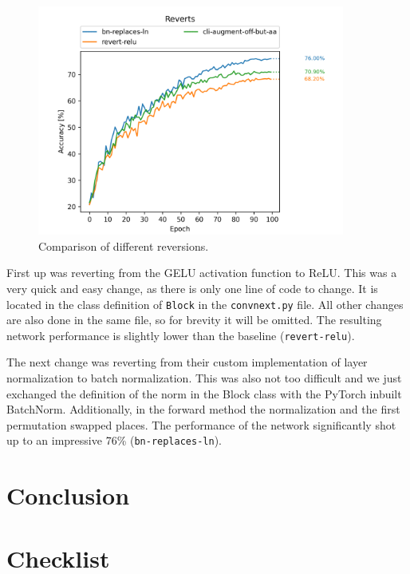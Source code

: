 \documentclass{article}
\begin{document}
    \begin{figure}[h]
        \centering
        \includegraphics[width=0.9\textwidth]{images/reverts}
        \caption{Comparison of different reversions.}
        \label{fig:reverts}
    \end{figure}

    First up was reverting from the GELU activation function to ReLU\@.
    This was a very quick and easy change, as there is only one line of code to change.
    It is located in the class definition of \texttt{Block} in the \texttt{convnext.py} file.
    All other changes are also done in the same file, so for brevity it will be omitted.
    The resulting network performance is slightly lower than the baseline (\texttt{revert-relu}).

    The next change was reverting from their custom implementation of layer normalization to batch normalization.
    This was also not too difficult and we just exchanged the definition of the norm in the Block class with the PyTorch inbuilt BatchNorm.
    Additionally, in the forward method the normalization and the first permutation swapped places.
    The performance of the network significantly shot up to an impressive 76\% (\texttt{bn-replaces-ln}).



    \section{Conclusion}\label{sec:conclusion}

    \printbibliography
    \section*{Checklist}
    
\end{document}
